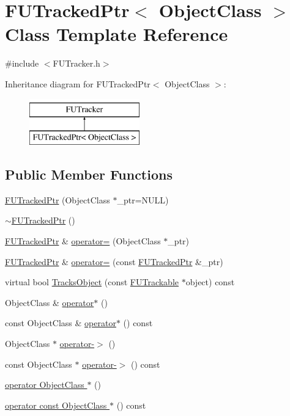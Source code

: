 \hypertarget{classFUTrackedPtr}{
\section{FUTrackedPtr$<$ ObjectClass $>$ Class Template Reference}
\label{classFUTrackedPtr}
}


{\ttfamily \#include $<$FUTracker.h$>$}

Inheritance diagram for FUTrackedPtr$<$ ObjectClass $>$:\begin{figure}[H]
\begin{center}
\leavevmode
\includegraphics[height=2.000000cm]{classFUTrackedPtr}
\end{center}
\end{figure}
\subsection*{Public Member Functions}
\begin{DoxyCompactItemize}
\item 
\hyperlink{classFUTrackedPtr_a8d06eda52089bd1b8083971fbbee4e8a}{FUTrackedPtr} (ObjectClass $\ast$\_\-ptr=NULL)
\item 
\hyperlink{classFUTrackedPtr_a90700d759d056aea22247057f2617b0f}{$\sim$FUTrackedPtr} ()
\item 
\hyperlink{classFUTrackedPtr}{FUTrackedPtr} \& \hyperlink{classFUTrackedPtr_a1c67239537e055d45f884b9b556daf58}{operator=} (ObjectClass $\ast$\_\-ptr)
\item 
\hyperlink{classFUTrackedPtr}{FUTrackedPtr} \& \hyperlink{classFUTrackedPtr_a6ee593ae6da2be257bd7646cf2813253}{operator=} (const \hyperlink{classFUTrackedPtr}{FUTrackedPtr} \&\_\-ptr)
\item 
virtual bool \hyperlink{classFUTrackedPtr_a8715a735d43ad08ecae5b716b3833433}{TracksObject} (const \hyperlink{classFUTrackable}{FUTrackable} $\ast$object) const 
\item 
ObjectClass \& \hyperlink{classFUTrackedPtr_a17f179100092048a16632f8ab0d4ac9d}{operator$\ast$} ()
\item 
const ObjectClass \& \hyperlink{classFUTrackedPtr_aecb920ff96938a8e88c51d4183ef1641}{operator$\ast$} () const 
\item 
ObjectClass $\ast$ \hyperlink{classFUTrackedPtr_ab47cb5dadec50c75c7ec7670ce204e99}{operator-\/$>$} ()
\item 
const ObjectClass $\ast$ \hyperlink{classFUTrackedPtr_ac0974140bd933025cc1511f8ff7e31ac}{operator-\/$>$} () const 
\item 
\hyperlink{classFUTrackedPtr_a46251fc0078061192dbbc91d0f3696ae}{operator ObjectClass $\ast$} ()
\item 
\hyperlink{classFUTrackedPtr_a967cbf01d3184c86a7b8edae489d7585}{operator const ObjectClass $\ast$} () const 
\end{DoxyCompactItemize}
